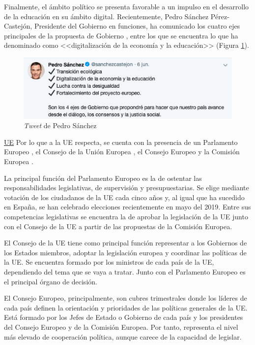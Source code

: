 Finalmente, el ámbito político se presenta favorable a un impulso en el desarrollo de la educación en su ámbito digital. Recientemente, Pedro Sánchez Pérez-Castejón, Presidente del Gobierno en funciones, ha comunicado los cuatro ejes principales de la propuesta de Gobierno \cite{tweetsanchez2019}, entre los que se encuentra lo que ha denominado como <<digitalización de la economía y la educación>> (Figura \ref{fig:tweetsanchez}).

\begin{figure}[h]
  \centering
  \includegraphics[width=0.6\linewidth]{figures/images/tweet_sanchez.png}
  \caption{\textit{Tweet} de Pedro Sánchez}
  \label{fig:tweetsanchez}
\end{figure}

\clearpage

\noindent\underline{\acs{UE}}\newline
\indent Por lo que a la \acs{UE} respecta, se cuenta con la presencia de un Parlamento Europeo \cite{parlamentoue}, el Consejo de la Unión Europea \cite{consejoue}, el Consejo Europeo \cite{consejoeuropeo} y la Comisión Europea \cite{comisionue}. 

La principal función del Parlamento Europeo es la de ostentar las responsabilidades legislativas, de supervisión y presupuestarias. Se elige mediante votación de los ciudadanos de la \acs{UE} cada cinco años y, al igual que ha sucedido en España, se han celebrado elecciones recientemente en mayo del 2019. Entre sus competencias legislativas se encuentra la de aprobar la legislación de la \acs{UE} junto con el Consejo de la \acs{UE} a partir de las propuestas de la Comisión Europea.

El Consejo de la \acs{UE} tiene como principal función representar a los Gobiernos de los Estados miembros, adoptar la legislación europea y coordinar las políticas de la \acs{UE}. Se encuentra formado por los ministros de cada país de la \acs{UE}, dependiendo del tema que se vaya a tratar. Junto con el Parlamento Europeo es el principal órgano de decisión.

El Consejo Europeo, principalmente, son cubres trimestrales donde los líderes de cada país definen la orientación y prioridades de las políticas generales de la \acs{UE}. Está formado por los Jefes de Estado o Gobierno de cada país y los presidentes del Consejo Europeo y de la Comisión Europea. Por tanto, representa el nivel más elevado de cooperación política, aunque carece de la capacidad de legislar.

